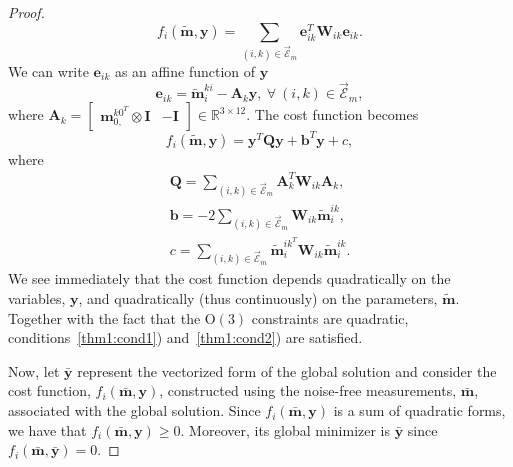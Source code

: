 \documentclass[lettersize,journal]{IEEEtran}
\newcommand{\EdgeSet}{\vec{\bm{\mathcal{E}}}}
\begin{document}
\begin{proof}
\begin{equation}
	f_i(\tilde{\bm{m}},\bm{y}) = \sum\limits_{(i,k)\in\EdgeSet_m} \bm{e}_{ik}^T \bm{W}_{ik} \bm{e}_{ik}.
\end{equation}
We can write $\bm{e}_{ik}$ as an affine function of $\bm{y}$
\begin{equation}
	\bm{e}_{ik} = \tilde{\bm{m}}_i^{ki} - \bm{A}_k \bm{y}, ~\forall ~(i,k)\in \EdgeSet_m,
\end{equation}
where $\bm{A}_k = \begin{bmatrix} \bm{m}_{0,}^{k0^T}\otimes\bm{I}& -\bm{I} \end{bmatrix}\in\mathbb{R}^{3\times12}$. The cost function becomes 
\begin{equation}
	f_i(\tilde{\bm{m}},\bm{y}) = \bm{y}^T \bm{Q} \bm{y} + \bm{b}^T \bm{y} + c, 
\end{equation}
where
\begin{gather}
	\bm{Q} = \sum\limits_{(i,k)\in\EdgeSet_m} \bm{A}_k^T \bm{W}_{ik} \bm{A}_k, \\
	\bm{b} = -2\sum\limits_{(i,k)\in\EdgeSet_m} \bm{W}_{ik}\tilde{\bm{m}}_i^{ik}, \\
	c=\sum\limits_{(i,k)\in\EdgeSet_m} \tilde{\bm{m}}_i^{ik^T}\bm{W}_{ik}\tilde{\bm{m}}_i^{ik}.
\end{gather}
We see immediately that the cost function depends quadratically on the variables, $\bm{y}$, and quadratically (thus continuously) on the parameters, $\tilde{\bm{m}}$. Together with the fact that the $\mbox{O}(3)$ constraints are quadratic, conditions~\ref{thm1:cond1}) and~\ref{thm1:cond2}) are satisfied.

Now, let $\bar{\bm{y}}$ represent the vectorized form of the global solution and consider the cost function, $f_i(\bar{\bm{m}},\bm{y})$, constructed using the noise-free measurements, $\bar{\bm{m}}$, associated with the global solution. Since $f_i(\bar{\bm{m}},\bm{y})$ is a sum of quadratic forms, we have that $f_i(\bar{\bm{m}},\bm{y})\geq 0$. Moreover, its global minimizer is $\bar{\bm{y}} $ since $f_i(\bar{\bm{m}},\bar{\bm{y}})= 0$. 


\end{proof}
\end{document}
